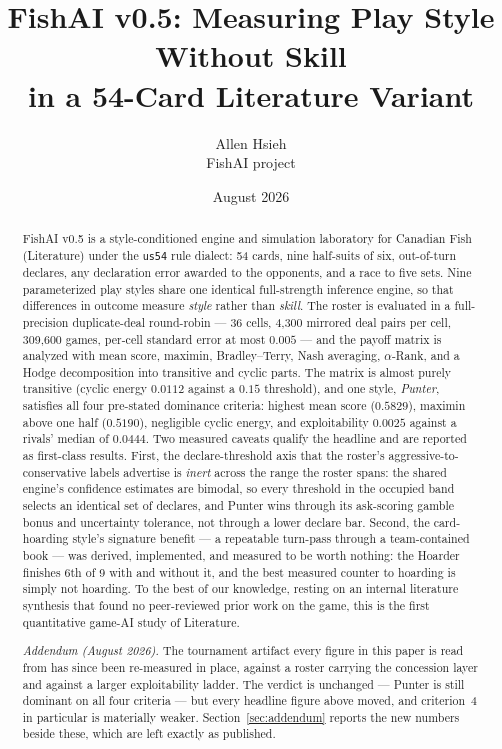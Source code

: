 \documentclass[11pt]{article}
\title{FishAI v0.5: Measuring Play Style Without Skill\\ in a 54-Card Literature Variant}
\author{Allen Hsieh\\[2pt] {\small FishAI project}}
\date{August 2026}
\newcommand{\code}[1]{\texttt{#1}}
\newcommand{\usff}{\code{us54}}
\begin{document}
\maketitle

\begin{abstract}
\noindent
FishAI v0.5 is a style-conditioned engine and simulation laboratory for Canadian Fish
(Literature) under the \usff{} rule dialect: 54 cards, nine half-suits of six, out-of-turn
declares, any declaration error awarded to the opponents, and a race to five sets. Nine
parameterized play styles share one identical full-strength inference engine, so that
differences in outcome measure \emph{style} rather than \emph{skill}. The roster is evaluated
in a full-precision duplicate-deal round-robin --- 36 cells, 4{,}300 mirrored deal pairs per
cell, 309{,}600 games, per-cell standard error at most $0.005$ --- and the payoff matrix is
analyzed with mean score, maximin, Bradley--Terry, Nash averaging, $\alpha$-Rank, and a Hodge
decomposition into transitive and cyclic parts. The matrix is almost purely transitive (cyclic
energy $0.0112$ against a $0.15$ threshold), and one style, \emph{Punter}, satisfies all four
pre-stated dominance criteria: highest mean score ($0.5829$), maximin above one half
($0.5190$), negligible cyclic energy, and exploitability $0.0025$ against a rivals' median of
$0.0444$. Two measured caveats qualify the headline and are reported as first-class results.
First, the declare-threshold axis that the roster's aggressive-to-conservative labels
advertise is \emph{inert} across the range the roster spans: the shared engine's confidence
estimates are bimodal, so every threshold in the occupied band selects an identical set of
declares, and Punter wins through its ask-scoring gamble bonus and uncertainty tolerance, not
through a lower declare bar. Second, the card-hoarding style's signature benefit --- a
repeatable turn-pass through a team-contained book --- was derived, implemented, and measured
to be worth nothing: the Hoarder finishes 6th of 9 with and without it, and the best measured
counter to hoarding is simply not hoarding. To the best of our knowledge, resting on an
internal literature synthesis that found no peer-reviewed prior work on the game, this is the
first quantitative game-AI study of Literature.

\smallskip
\noindent\emph{Addendum (August 2026).} The tournament artifact every figure in this paper is
read from has since been re-measured in place, against a roster carrying the concession layer
and against a larger exploitability ladder. The verdict is unchanged --- Punter is still
dominant on all four criteria --- but every headline figure above moved, and criterion~4 in
particular is materially weaker. Section~\ref{sec:addendum} reports the new numbers beside
these, which are left exactly as published.
\end{abstract}
\end{document}
